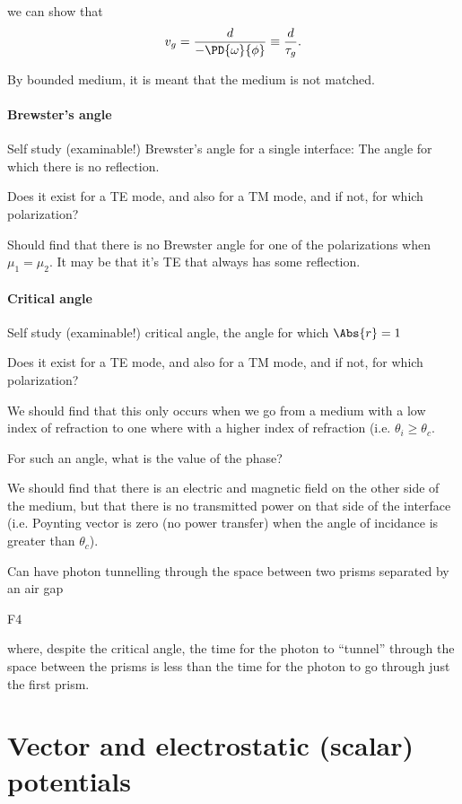we can show that
\begin{dmath}\label{eqn:emtLecture10:700}
v_g 
= \frac{d}{-\PD{\omega}{\phi}}
\equiv
\frac{d}{\tau_g}.
\end{dmath}

By bounded medium, it is meant that the medium is not matched.

\paragraph{Brewster's angle}

Self study (examinable!) Brewster's angle for a single interface: The angle for which there is no reflection.

Does it exist for a TE mode, and also for a TM mode, and if not, for which polarization?

Should find that there is no Brewster angle for one of the polarizations when \( \mu_1 = \mu_2 \).  It may be that it's TE that always has some reflection.

\paragraph{Critical angle}

Self study (examinable!) critical angle, the angle for which \( \Abs{r} = 1 \)

Does it exist for a TE mode, and also for a TM mode, and if not, for which polarization?

We should find that this only occurs when we go from a medium with a low index of refraction to one where with a higher index of refraction (i.e. \( \theta_i \ge \theta_c \).

For such an angle, what is the value of the phase?

We should find that there is an electric and magnetic field on the other side of the medium, but that there is no transmitted power on that side of the interface (i.e. Poynting vector is zero (no power transfer) when the angle of incidance is greater than \( \theta_c \)).

Can have photon tunnelling through the space between two prisms separated by an air gap

F4

where, despite the critical angle, the time for the photon to ``tunnel'' through the space between the prisms is less than the time for the photon to go through just the first prism.

\section{Vector and electrostatic (scalar) potentials}

